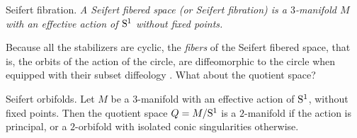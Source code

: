 \begin{Article}{Seifert fibration.}{\itshape
  A \emph{Seifert fibered space} (or Seifert fibration) is a $3$-manifold $M$ with an effective action of $\mathrm{S}^1$ without fixed points.
  }
\end{Article}

Because all the stabilizers are cyclic,
the \emph{fibers} of the Seifert fibered space,
that is,
the orbits of the action of the circle,
are diffeomorphic to the circle
when equipped with their subset diffeology \cite[\textsection\,1]{IZK12}.
What about the quotient space?

\begin{Article}{Seifert orbifolds.}{}
  Let $M$ be a $3$-manifold with an effective action of $\mathrm{S}^1$,
  without fixed points.
  Then the quotient space $Q = M/\mathrm{S}^1$ is a $2$-manifold if the action is principal,
  or a $2$-orbifold with isolated conic singularities otherwise.
\end{Article}

